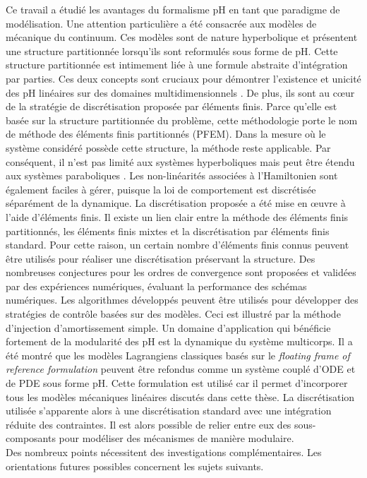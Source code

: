 Ce travail a étudié les avantages du formalisme pH en tant que paradigme de modélisation. Une attention particulière a été consacrée aux modèles de mécanique du continuum. Ces modèles sont de nature hyperbolique et présentent une structure partitionnée lorsqu'ils sont reformulés sous forme de pH. Cette structure partitionnée est intimement liée à une formule abstraite d'intégration par parties. Ces deux concepts sont cruciaux pour démontrer l'existence et unicité des pH linéaires sur des domaines multidimensionnels \cite{skrepek2019wellposedness}. De plus, ils sont au c\oe{}ur de la stratégie de discrétisation proposée par éléments finis. Parce qu'elle est basée sur la structure partitionnée du problème, cette méthodologie porte le nom de méthode des éléments finis partitionnés (PFEM). Dans la mesure où le système considéré possède cette structure, la méthode reste applicable. Par conséquent, il n'est pas limité aux systèmes hyperboliques mais peut être étendu aux systèmes paraboliques \cite{serhani2019discretization}. Les non-linéarités associées à l'Hamiltonien sont également faciles à gérer, puisque la loi de comportement est discrétisée séparément de la dynamique. La discrétisation proposée a été mise en \oe{}uvre à l'aide d'éléments finis. Il existe un lien clair entre la méthode des éléments finis partitionnés, les éléments finis mixtes et la discrétisation par éléments finis standard. Pour cette raison, un certain nombre d'éléments finis connus peuvent être utilisés pour réaliser une discrétisation préservant la structure. Des nombreuses conjectures pour les ordres de convergence sont proposées et validées par des expériences numériques, évaluant la performance des schémas numériques. Les algorithmes développés peuvent être utilisés pour développer des stratégies de contrôle basées sur des modèles. Ceci est illustré par la méthode d'injection d'amortissement simple. Un domaine d'application qui bénéficie fortement de la modularité des pH est la dynamique du système multicorps. Il a été montré que les modèles Lagrangiens classiques basés sur le \textit{floating frame of reference formulation} peuvent être refondus comme un système couplé d'ODE et de PDE sous forme pH. Cette formulation est utilisé car il permet d'incorporer tous les modèles mécaniques linéaires discutés dans cette thèse. La discrétisation utilisée s'apparente alors à une discrétisation standard avec une intégration réduite des contraintes. Il est alors possible de relier entre eux des sous-composants pour modéliser des mécanismes de manière modulaire. \\ Des nombreux points nécessitent des investigations complémentaires. Les orientations futures possibles concernent les sujets suivants.

